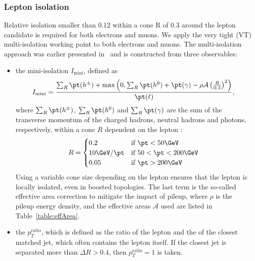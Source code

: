     \subsubsection{Lepton isolation}
      Relative isolation smaller than 0.12 within a cone R of 0.3 around the lepton candidate is required for both electrons and muons.
      We apply the very tight (VT) multi-isolation working point to both electrons and muons. The multi-isolation approach was earlier presented in~\citep{CMS_NOTE_2015-133} and is constructed from three observables:
      \begin{itemize}
        \item the mini-isolation $I_\text{mini}$, defined as
              \begin{equation}
                I_\text{mini} = \frac{\sum_R \pt(h^\pm) + \text{max}\left(0, \sum_R \pt(h^0)+\pt(\gamma) - \rho\mathcal{A}\left(\frac{R}{0.3}\right)^2\right)}{\pt(\ell)},
              \end{equation}
              where $\sum_R\pt(h^\pm)$, $\sum_R\pt(h^0)$ and $\sum_R\pt(\gamma)$ are the sum of the transverse momentum of the charged hadrons, neutral hadrons and photons, respectively, within a cone $R$
              dependent on the lepton \pt:
              \begin{equation}
                  R = \begin{cases}
		    0.2          & \text{if } \pt < 50\GeV \\
		    10\GeV/\pt   & \text{if } 50 < \pt < 200\GeV \\
		    0.05         & \text{if } \pt > 200\GeV
                  \end{cases}
              \end{equation}
              Using a variable cone size depending on the lepton \pt ensures that the lepton is locally isolated, even in boosted topologies.
              The last term is the so-called effective area correction to mitigate the impact of pileup, where $\rho$ is the pileup energy density, %
              and the effective areas $\mathcal{A}$ used are listed in Table~\ref{table:effArea}.
              
        \item the $p_T^\text{ratio}$, which is defined as the ratio of the lepton \pt and the \pt of the closest matched jet, which often contains the lepton itself. 
              If the closest jet is separated more than $\Delta R > 0.4$, then $p_T^\text{ratio} = 1$ is taken. 

\end{itemize}

